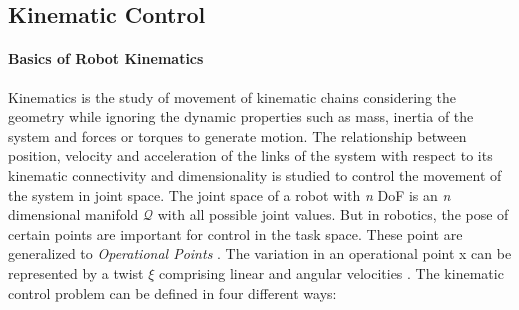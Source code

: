 \subsection{Kinematic Control}
\paragraph{Basics of Robot Kinematics}
Kinematics is the study of movement of kinematic chains considering the geometry while ignoring the dynamic properties such as mass, inertia of the system and forces or torques to generate motion. The relationship between position, velocity and acceleration of the links of the system with respect to its kinematic connectivity and dimensionality is studied to control the movement of the system in joint space. The joint space of a robot with \textit{n} DoF is an \textit{n} dimensional manifold $\mathcal{Q}$ with all possible joint values. But in robotics, the pose of certain points are important for control in the task space. These point are generalized to \textit{Operational Points} \cite{Khatib1987}. The variation in an operational point x can be represented by a twist $\xi$ comprising linear and angular velocities \cite{featherstone2008rigid,Murray1994}. The kinematic control problem can be defined in four different ways:

